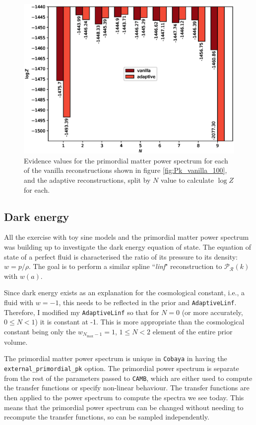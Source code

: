 \documentclass{article}
\begin{document}
\newpage

\begin{figure}[H]
  \centering
  \includegraphics[width=13cm]{PklogZ.eps}
  \caption{Evidence values for the primordial matter power spectrum for each of the vanilla reconstructions shown in figure \ref{fig:Pk_vanilla_100}, and the adaptive reconstructions, split by $N$ value to calculate $\log{Z}$ for each.}
  \label{fig:PklogZ}
\end{figure}

\subsection{Dark energy}
\label{sec:de}

All the exercise with toy sine models and the primordial matter power spectrum was building up to investigate the dark energy equation of state. The equation of state of a perfect fluid is characterised the ratio of its pressure to its density: $w = p/\rho$. The goal is to perform a similar spline ``\textit{linf}" reconstruction to $\mathcal P_\mathcal R(k)$ with $w(a)$.

Since dark energy exists as an explanation for the cosmological constant, i.e., a fluid with $w=-1$, this needs to be reflected in the prior and \texttt{AdaptiveLinf}. Therefore, I modified my \texttt{AdaptiveLinf} so that for $N=0$ (or more accurately, $0\le N <1$) it is constant at -1. This is more appropriate than the cosmological constant being only the $w_{N_\textrm{max}-1} = 1$, $1\le N<2$ element of the entire prior volume.

The primordial matter power spectrum is unique in \texttt{Cobaya} in having the \texttt{external\_primordial\_pk} option. The primordial power spectrum is separate from the rest of the parameters passed to \texttt{CAMB}, which are either used to compute the transfer functions or specify non-linear behaviour. The transfer functions are then applied to the power spectrum to compute the spectra we see today. This means that the primordial power spectrum can be changed without needing to recompute the transfer functions, so can be sampled independently.
\end{document}
